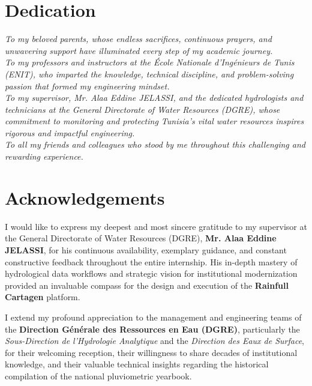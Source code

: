 \documentclass[12pt,a4paper]{report}
\begin{document}
\chapter*{Dedication}
\thispagestyle{empty}

\vspace{3cm}
\begin{center}
\textit{
To my beloved parents, whose endless sacrifices, continuous prayers, and unwavering support have illuminated every step of my academic journey.\\[0.6cm]
To my professors and instructors at the École Nationale d'Ingénieurs de Tunis (ENIT), who imparted the knowledge, technical discipline, and problem-solving passion that formed my engineering mindset.\\[0.6cm]
To my supervisor, Mr. Alaa Eddine JELASSI, and the dedicated hydrologists and technicians at the General Directorate of Water Resources (DGRE), whose commitment to monitoring and protecting Tunisia's vital water resources inspires rigorous and impactful engineering.\\[0.6cm]
To all my friends and colleagues who stood by me throughout this challenging and rewarding experience.
}
\end{center}
\newpage

\chapter*{Acknowledgements}

I would like to express my deepest and most sincere gratitude to my supervisor at the General Directorate of Water Resources (DGRE), \textbf{Mr. Alaa Eddine JELASSI}, for his continuous availability, exemplary guidance, and constant constructive feedback throughout the entire internship. His in-depth mastery of hydrological data workflows and strategic vision for institutional modernization provided an invaluable compass for the design and execution of the \textbf{Rainfull Cartagen} platform.

I extend my profound appreciation to the management and engineering teams of the \textbf{Direction Générale des Ressources en Eau (DGRE)}, particularly the \textit{Sous-Direction de l'Hydrologie Analytique} and the \textit{Direction des Eaux de Surface}, for their welcoming reception, their willingness to share decades of institutional knowledge, and their valuable technical insights regarding the historical compilation of the national pluviometric yearbook.
\end{document}
